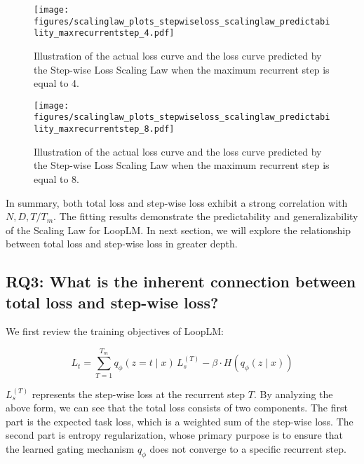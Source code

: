 \documentclass[]{bytedance_seed}
\newcommand{\1}{\mathbf{1}}
\newcommand{\ut}{LoopLM}
\begin{document}
\begin{figure}[htbp!]
    \centering
    \texttt{[image: figures/scalinglaw\_plots\_stepwiseloss\_scalinglaw\_predictability\_maxrecurrentstep\_4.pdf]}
    \caption{Illustration of the actual loss curve and the loss curve predicted by the Step-wise Loss Scaling Law when the maximum recurrent step is equal to 4.}
    \label{fig:scalinglaw_stepwiseloss_scalinglaw_predictability_maxrecurrentstep_4}
\end{figure}

\begin{figure}[htbp!]
    \centering
    \texttt{[image: figures/scalinglaw\_plots\_stepwiseloss\_scalinglaw\_predictability\_maxrecurrentstep\_8.pdf]}
    \caption{Illustration of the actual loss curve and the loss curve predicted by the Step-wise Loss Scaling Law when the maximum recurrent step is equal to 8.}
    \label{fig:scalinglaw_stepwiseloss_scalinglaw_predictability_maxrecurrentstep_8}
\end{figure}

In summary, both total loss and step-wise loss exhibit a strong correlation with $N,D,T/T_m$. The fitting results demonstrate the predictability and generalizability of the Scaling Law for \ut{}. In next section, we will explore the relationship between total loss and step-wise loss in greater depth.

\subsection{RQ3: What is the inherent connection between total loss and step-wise loss?}
\label{sec:scalinglaw_rq3}

We first review the training objectives of \ut{}:

$$
L_t = \sum_{T=1}^{T_{m}} q_\phi(z=t \mid x)\, L_{s}^{(T)} - \beta \cdot H(q_\phi(z \mid x))
$$

$L_s^{(T)}$ represents the step-wise loss at the recurrent step $T$. By analyzing the above form, we can see that the total loss consists of two components. The first part is the expected task loss, which is a weighted sum of the step-wise loss. The second part is entropy regularization, whose primary purpose is to ensure that the learned gating mechanism $q_\phi$ does not converge to a specific recurrent step. 
\end{document}
